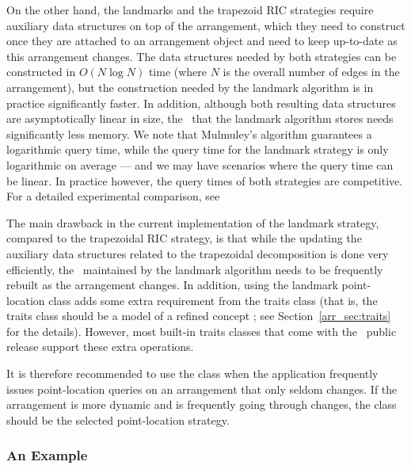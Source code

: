 On the other hand, the landmarks and the trapezoid RIC strategies
require auxiliary data structures on top of the arrangement, which
they need to construct once they are attached to an arrangement
object and need to keep up-to-date as this arrangement changes.
The data structures needed by both strategies can be constructed
in $O(N \log N)$ time (where $N$ is the overall number of edges in
the arrangement),
but the construction needed by the landmark algorithm is in
practice significantly faster. In addition, although both
resulting data structures are asymptotically linear in size, the
\kdtree\ that the landmark algorithm stores needs significantly
less memory. We note that Mulmuley's algorithm guarantees a
logarithmic query time, while the query time for the landmark
strategy is only logarithmic on average --- and we may have
scenarios where the query time can be linear. In practice however,
the query times of both strategies are competitive. For a detailed
experimental comparison, see \cite{hh-esplp-08}

The main drawback in the current implementation of the landmark
strategy, compared to the trapezoidal RIC strategy, is that while
the updating the auxiliary data structures
related to the trapezoidal decomposition is done very efficiently,
the \kdtree\ maintained by the landmark algorithm needs to be
frequently rebuilt as the arrangement changes. In addition, using
the landmark point-location class adds some extra requirement
from the traits class (that is, the traits class should be a model
of a refined concept ; see
Section~\ref{arr_sec:traits} for the details). However, most
built-in traits classes that come with the \cgal\ public release
support these extra operations.

It is therefore recommended to use the
 class when the application
frequently issues point-location queries on an
arrangement that only seldom changes. If the arrangement is more
dynamic and is frequently going through changes, the
 class should be the
selected point-location strategy.

\subsubsection{An Example\label{arr_sssec:pl_ex}}

